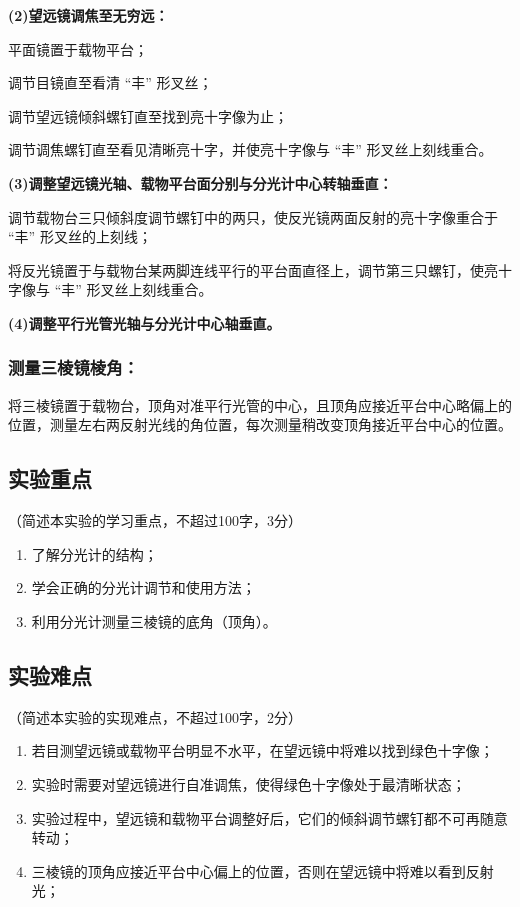 \documentclass[10pt,a4paper]{ctexart}
\newcommand{\xiaosi}{\fontsize{12pt}{16pt}\selectfont}
\begin{document}
    \textbf{(2)望远镜调焦至无穷远：}
        
    平面镜置于载物平台；

    调节目镜直至看清 “丰” 形叉丝；

    调节望远镜倾斜螺钉直至找到亮十字像为止；
        
    调节调焦螺钉直至看见清晰亮十字，并使亮十字像与 “丰” 形叉丝上刻线重合。

    \textbf{(3)调整望远镜光轴、载物平台面分别与分光计中心转轴垂直：}

    调节载物台三只倾斜度调节螺钉中的两只，使反光镜两面反射的亮十字像重合于 “丰” 形叉丝的上刻线；

    将反光镜置于与载物台某两脚连线平行的平台面直径上，调节第三只螺钉，使亮十字像与 “丰” 形叉丝上刻线重合。

   \textbf{(4)调整平行光管光轴与分光计中心轴垂直。}

    
    \subsubsection*{测量三棱镜棱角：}
    
    将三棱镜置于载物台，顶角对准平行光管的中心，且顶角应接近平台中心略偏上的位置，测量左右两反射光线的角位置，每次测量稍改变顶角接近平台中心的位置。

    
    \subsection{实验重点}

    \xiaosi（简述本实验的学习重点，不超过100字，3分）


    \begin{enumerate}   
        \item 了解分光计的结构；
        \item 学会正确的分光计调节和使用方法；
        \item 利用分光计测量三棱镜的底角（顶角）。

    \end{enumerate}  
    
    
    \subsection{实验难点}
    
    \xiaosi（简述本实验的实现难点，不超过100字，2分）

    \begin{enumerate}    
        \item 若目测望远镜或载物平台明显不水平，在望远镜中将难以找到绿色十字像；
        \item 实验时需要对望远镜进行自准调焦，使得绿色十字像处于最清晰状态；
        \item 实验过程中，望远镜和载物平台调整好后，它们的倾斜调节螺钉都不可再随意转动；
        \item 三棱镜的顶角应接近平台中心偏上的位置，否则在望远镜中将难以看到反射光；
    \end{enumerate}  
\end{document}
